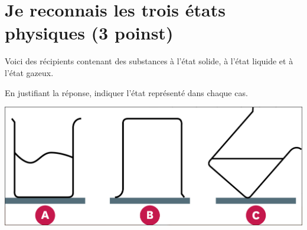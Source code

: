 \section{Je reconnais les trois états physiques (3 poinst)}

Voici des récipients contenant des substances à l'état solide, à l'état liquide et à l'état gazeux.

\begin{questions}
	\question[3] En justifiant la réponse, indiquer l'état représenté dans chaque cas.
		
		\begin{center}
			\includegraphics[scale=0.4]{img/reco1}
		\end{center}
	

\end{questions}